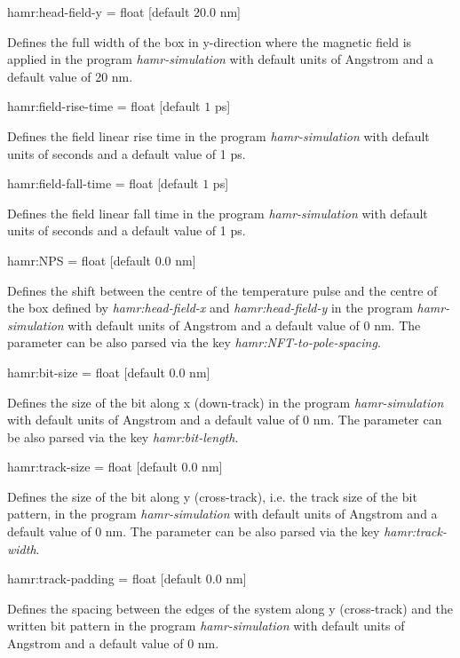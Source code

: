 {\zicf hamr:head-field-y = float [default $20.0$ nm]}
Defines the full width of the box in y-direction where the magnetic field is applied
in the program \textit{hamr-simulation} with default units of Angstrom and a default value of 20 nm.

{\zicf hamr:field-rise-time = float [default $1$ ps]}
Defines the field linear rise time in the program \textit{hamr-simulation} with default units of seconds and a default value of 1 ps.

{\zicf hamr:field-fall-time = float [default $1$ ps]}
Defines the field linear fall time in the program \textit{hamr-simulation} with default units of seconds and a default value of 1 ps.

{\zicf hamr:NPS = float [default $0.0$ nm]}
Defines the shift between the centre of the temperature pulse and the centre of the box defined by \textit{hamr:head-field-x} and \textit{hamr:head-field-y}
in the program \textit{hamr-simulation} with default units of Angstrom and a default value of 0 nm.
The parameter can be also parsed via the key \textit{hamr:NFT-to-pole-spacing}.

{\zicf hamr:bit-size = float [default $0.0$ nm]}
Defines the size of the bit along x (down-track)
in the program \textit{hamr-simulation} with default units of Angstrom and a default value of 0 nm.
The parameter can be also parsed via the key \textit{hamr:bit-length}.

{\zicf hamr:track-size = float [default $0.0$ nm]}
Defines the size of the bit along y (cross-track), i.e. the track size of the bit pattern,
in the program \textit{hamr-simulation} with default units of Angstrom and a default value of 0 nm.
The parameter can be also parsed via the key \textit{hamr:track-width}.

{\zicf hamr:track-padding = float [default $0.0$ nm]}
Defines the spacing between the edges of the system along y (cross-track) and the written bit pattern
in the program \textit{hamr-simulation} with default units of Angstrom and a default value of 0 nm.

